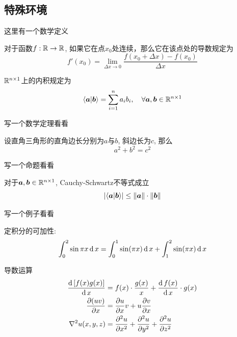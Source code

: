 \subsection{特殊环境}


这里有一个数学定义
\begin{definition}
对于函数$f: \mathbb{R} \to \mathbb{R}$, 如果它在点$x_0$处连续，那么它在该点处的导数规定为
\begin{equation}
f'(x_0) = \lim_{\Delta x\to 0} \frac{f(x_0 + \Delta x) - f(x_0)}{\Delta x}
\end{equation}
\end{definition}

\begin{definition}[内积]
$\mathbb{R}^{{n}\times {1}}$上的内积规定为
\begin{equation}
\langle \bm{a} | \bm{b} \rangle = \sum^n_{i=1} a_ib_i, \quad \forall \bm{a}, \bm{b}\in \mathbb{R}^{{n}\times {1}}
\end{equation}
\end{definition}

写一个数学定理看看
\begin{theorem}
设直角三角形的直角边长分别为$a$与$b$, 斜边长为$c$, 那么
\begin{equation}
a^2 + b^2 = c^2
\end{equation}
\end{theorem}


写一个命题看看
\begin{proposition}
对于$\bm{a},\bm{b}\in \mathbb{R}^{{n}\times {1}}$, Cauchy-Schwartz不等式成立
\begin{equation}
\left| \langle \bm{a} | \bm{b} \rangle \right|\le \left\lVert \bm{a} \right\rVert\cdot \left\lVert \bm{b} \right\rVert
\end{equation}
\end{proposition}



写一个例子看看

\begin{example}
定积分的可加性:
$$
\int^2_0 \sin \pi x \operatorname{\mathrm{d}} x = \int^1_0 \sin(\pi x) \operatorname{\mathrm{d}} x + \int^2_1 \sin(\pi x) \operatorname{\mathrm{d}} x
$$
\end{example}

\begin{example} 导数运算
\begin{align}
\frac{\operatorname{\mathrm{d}} {[f(x)g(x)]}}{\operatorname{\mathrm{d}} {x}} 
&= f(x)\cdot \frac{g(x)}{x} + \frac{\operatorname{\mathrm{d}} {f(x)}}{\operatorname{\mathrm{d}} {x}}\cdot g(x) \\
\frac{\partial {(uv)}}{\partial {x}}& = \frac{\partial {u}}{\partial {x}}v + u\frac{\partial {v}}{\partial {x}}\\
\nabla^2u(x,y,z)& = \frac{\partial^2 {u}}{\partial {x}^2} + \frac{\partial^2 {u}}{\partial {y}^2} +\frac{\partial^2 {u}}{\partial {z}^2}
\end{align}
\end{example}

